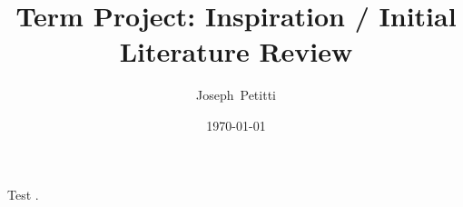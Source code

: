 \documentclass[a4paper, 10pt, american]{article}
\title{Term Project: Inspiration / Initial Literature Review}
\author{Joseph~Petitti}
\date{\today}
\begin{document}
\maketitle

\lipsum

Test \cite{Abril:2007:PHD:1188913.1188915}.



\end{document}
